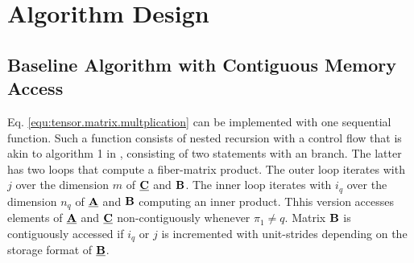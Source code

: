 \section{Algorithm Design}
\label{sec:design}






\subsection{Baseline Algorithm with Contiguous Memory Access}
\label{sec:design:modified.baseline.algorithm}
Eq. \ref{equ:tensor.matrix.multplication} can be implemented with one sequential  function.
Such a function consists of nested recursion with a control flow that is akin to algorithm 1 in \cite{bassoy:2018:fast}, consisting of two  statements with an  branch.
The latter has two loops that compute a fiber-matrix product.
The outer loop iterates with $j$ over the dimension $m$ of $\underline{\mathbf{C}}$ and $\mathbf{B}$.
The inner loop iterates with $i_q$ over the dimension $n_q$ of $\underline{\mathbf{A}}$ and $\mathbf{B}$ computing an inner product. 
Thhis version accesses elements of $\underline{\mathbf{A}}$ and $\underline{\mathbf{C}}$ non-contiguously whenever $\pi_1 \neq q$.
Matrix $\mathbf{B}$ is contiguously accessed if $i_q$ or $j$ is incremented with unit-strides depending on the storage format of $\underline{\mathbf{B}}$.


